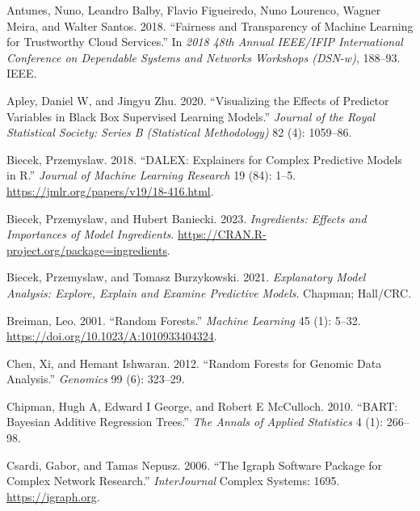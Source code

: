 \hypertarget{refs}{}
\begin{CSLReferences}{1}{0}
\leavevmode{}%
Antunes, Nuno, Leandro Balby, Flavio Figueiredo, Nuno Lourenco, Wagner Meira, and Walter Santos. 2018. {``Fairness and Transparency of Machine Learning for Trustworthy Cloud Services.''} In \emph{2018 48th Annual IEEE/IFIP International Conference on Dependable Systems and Networks Workshops (DSN-w)}, 188--93. IEEE.

\leavevmode{}%
Apley, Daniel W, and Jingyu Zhu. 2020. {``Visualizing the Effects of Predictor Variables in Black Box Supervised Learning Models.''} \emph{Journal of the Royal Statistical Society: Series B (Statistical Methodology)} 82 (4): 1059--86.

\leavevmode{}%
Biecek, Przemyslaw. 2018. {``DALEX: Explainers for Complex Predictive Models in {R}.''} \emph{Journal of Machine Learning Research} 19 (84): 1--5. \url{https://jmlr.org/papers/v19/18-416.html}.

\leavevmode{}%
Biecek, Przemyslaw, and Hubert Baniecki. 2023. \emph{Ingredients: Effects and Importances of Model Ingredients}. \url{https://CRAN.R-project.org/package=ingredients}.

\leavevmode{}%
Biecek, Przemyslaw, and Tomasz Burzykowski. 2021. \emph{Explanatory Model Analysis: Explore, Explain and Examine Predictive Models}. Chapman; Hall/CRC.

\leavevmode{}%
Breiman, Leo. 2001. {``Random Forests.''} \emph{Machine Learning} 45 (1): 5--32. \url{https://doi.org/10.1023/A:1010933404324}.

\leavevmode{}%
Chen, Xi, and Hemant Ishwaran. 2012. {``Random Forests for Genomic Data Analysis.''} \emph{Genomics} 99 (6): 323--29.

\leavevmode{}%
Chipman, Hugh A, Edward I George, and Robert E McCulloch. 2010. {``BART: Bayesian Additive Regression Trees.''} \emph{The Annals of Applied Statistics} 4 (1): 266--98.

\leavevmode{}%
Csardi, Gabor, and Tamas Nepusz. 2006. {``The Igraph Software Package for Complex Network Research.''} \emph{InterJournal} Complex Systems: 1695. \url{https://igraph.org}.


\end{CSLReferences}
